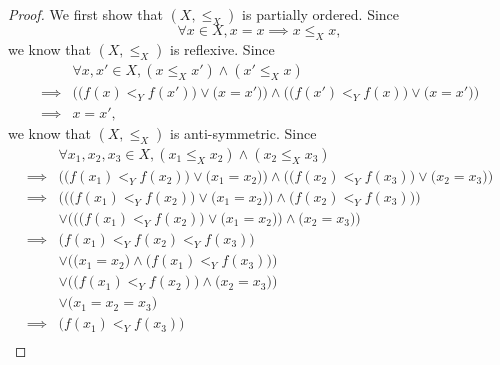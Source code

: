\begin{proof}
    We first show that \((X, \leq_X)\) is partially ordered.
    Since
    \[
        \forall x \in X, x = x \implies x \leq_X x,
    \]
    we know that \((X, \leq_X)\) is reflexive.
    Since
    \begin{align*}
                 & \forall x, x' \in X, (x \leq_X x') \land (x' \leq_X x)                                                                  \\
        \implies & \Big(\big(f(x) <_Y f(x')\big) \lor \big(x = x'\big)\Big) \land \Big(\big(f(x') <_Y f(x)\big) \lor \big(x = x'\big)\Big) \\
        \implies & x = x',
    \end{align*}
    we know that \((X, \leq_X)\) is anti-symmetric.
    Since
    \begin{align*}
                 & \forall x_1, x_2, x_3 \in X, (x_1 \leq_X x_2) \land (x_2 \leq_X x_3)                                                                \\
        \implies & \Big(\big(f(x_1) <_Y f(x_2)\big) \lor \big(x_1 = x_2\big)\Big) \land \Big(\big(f(x_2) <_Y f(x_3)\big) \lor \big(x_2 = x_3\big)\Big) \\
        \implies & \bigg(\Big(\big(f(x_1) <_Y f(x_2)\big) \lor \big(x_1 = x_2\big)\Big) \land \big(f(x_2) <_Y f(x_3)\big)\bigg)                        \\
                 & \lor \bigg(\Big(\big(f(x_1) <_Y f(x_2)\big) \lor \big(x_1 = x_2\big)\Big) \land \big(x_2 = x_3\big)\bigg)                           \\
        \implies & \big(f(x_1) <_Y f(x_2) <_Y f(x_3)\big)                                                                                              \\
                 & \lor \Big(\big(x_1 = x_2\big) \land \big(f(x_1) <_Y f(x_3)\big)\Big)                                                                \\
                 & \lor \Big(\big(f(x_1) <_Y f(x_2)\big) \land \big(x_2 = x_3\big)\Big)                                                                \\
                 & \lor \big(x_1 = x_2 = x_3\big)                                                                                                      \\
        \implies & \big(f(x_1) <_Y f(x_3)\big)                                                                                                         \\

\end{align*}
\end{proof}
